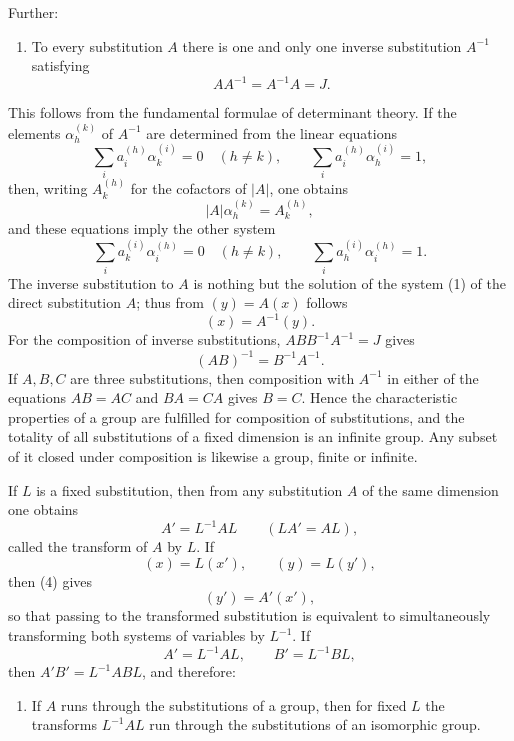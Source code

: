 \documentclass[11pt]{article}
\begin{document}
Further:
\begin{enumerate}[label=\arabic*.,leftmargin=2.2em,start=6]
\item To every substitution $A$ there is one and only one inverse substitution $A^{-1}$ satisfying
\begin{equation}
AA^{-1}=A^{-1}A=J.
\tag{15}
\end{equation}
\end{enumerate}
This follows from the fundamental formulae of determinant theory. If the elements $\alpha_h^{(k)}$ of $A^{-1}$ are determined from the linear equations
\begin{equation}
\sum_i a_i^{(h)}\alpha_k^{(i)}=0\quad(h\ne k),\qquad
\sum_i a_i^{(h)}\alpha_h^{(i)}=1,
\tag{16}
\end{equation}
then, writing $A_k^{(h)}$ for the cofactors of $|A|$, one obtains
\begin{equation}
|A|\alpha_h^{(k)}=A_k^{(h)},
\tag{17}
\end{equation}
and these equations imply the other system
\begin{equation}
\sum_i a_k^{(i)}\alpha_i^{(h)}=0\quad(h\ne k),\qquad
\sum_i a_h^{(i)}\alpha_i^{(h)}=1.
\tag{18}
\end{equation}
The inverse substitution to $A$ is nothing but the solution of the system (1) of the direct substitution $A$; thus from $(y)=A(x)$ follows
\begin{equation}
(x)=A^{-1}(y).
\tag{19}
\end{equation}
For the composition of inverse substitutions, $ABB^{-1}A^{-1}=J$ gives
\begin{equation}
(AB)^{-1}=B^{-1}A^{-1}.
\tag{20}
\end{equation}
If $A,B,C$ are three substitutions, then composition with $A^{-1}$ in either of the equations $AB=AC$ and $BA=CA$ gives $B=C$. Hence the characteristic properties of a group are fulfilled for composition of substitutions, and the totality of all substitutions of a fixed dimension is an infinite group. Any subset of it closed under composition is likewise a group, finite or infinite.

If $L$ is a fixed substitution, then from any substitution $A$ of the same dimension one obtains
\begin{equation}
A'=L^{-1}AL\qquad(LA'=AL),
\tag{21}
\end{equation}
called the transform of $A$ by $L$. If
\begin{equation}
(x)=L(x'),\qquad (y)=L(y'),
\tag{22}
\end{equation}
then (4) gives
\begin{equation}
(y')=A'(x'),
\tag{23}
\end{equation}
so that passing to the transformed substitution is equivalent to simultaneously transforming both systems of variables by $L^{-1}$. If
\[
A'=L^{-1}AL,
\qquad
B'=L^{-1}BL,
\]
then $A'B'=L^{-1}ABL$, and therefore:
\begin{enumerate}[label=\arabic*.,leftmargin=2.2em,start=7]
\item If $A$ runs through the substitutions of a group, then for fixed $L$ the transforms $L^{-1}AL$ run through the substitutions of an isomorphic group.
\end{enumerate}
\end{document}
